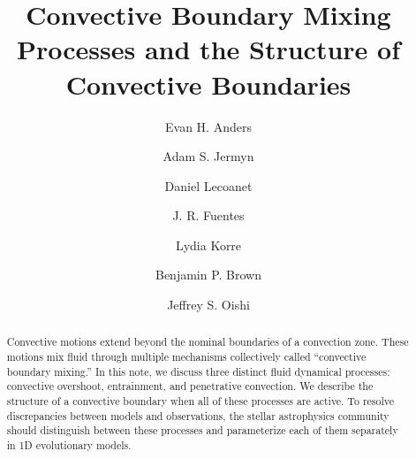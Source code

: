 \documentclass[linenumbers]{aastex631}
\begin{document}
\title{Convective Boundary Mixing Processes and the Structure of Convective Boundaries}
\author[0000-0002-3433-4733]{Evan H. Anders}
\author[0000-0001-5048-9973]{Adam S. Jermyn}
\author[0000-0002-7635-9728]{Daniel Lecoanet}
\author[0000-0003-2124-9764]{J. R. Fuentes}
\author[0000-0002-0963-4881]{Lydia Korre}
\author[0000-0001-8935-219X]{Benjamin P. Brown}
\author[0000-0001-8531-6570]{Jeffrey S. Oishi}


\begin{abstract}
    Convective motions extend beyond the nominal boundaries of a convection zone.
    These motions mix fluid through multiple mechanisms collectively called ``convective boundary mixing.''
    In this note, we discuss three distinct fluid dynamical processes: convective overshoot, entrainment, and penetrative convection.
    We describe the structure of a convective boundary when all of these processes are active.
    To resolve discrepancies between models and observations, the stellar astrophysics community should distinguish between these processes and parameterize each of them separately in 1D evolutionary models.
\end{abstract}










\end{document}
